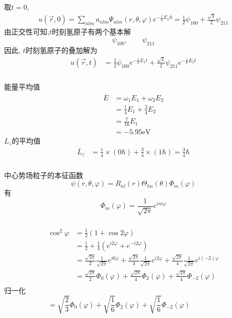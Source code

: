   \begin{frame}[label=current]
  \frametitle{}
  取$t=0$, 
  \[
  \begin{aligned}
   u(\vec{r},0)  =  \sum_{nlm} a_{nlm} \Psi _{nlm}(r,\theta,\varphi) e^{-\frac{i}{\hbar}E_n 0 } =\frac{1}{2}\psi _{100} + \frac{\sqrt{3} }{2}\psi _{211}
  \end{aligned} 
  \]
  由正交性可知,$t$时刻氢原子有两个基本解
  \[ \psi _{100}, \qquad \psi _{211}\]
  因此, $t$时刻氢原子的叠加解为
  \[
  \begin{aligned}
   u(\vec{r},t) &= \frac{1}{2}\psi _{100}e^{-\frac{i}{\hbar}E_1 t} + \frac{\sqrt{3} }{2}\psi _{211} e^{-\frac{i}{\hbar}E_2 t}
  \end{aligned} 
  \]
  \end{frame} 
  
  \begin{frame}[label=current]
  \frametitle{}
  能量平均值
  \[
  \begin{aligned}
   \overline{E} &= \omega _1 E_1 + \omega _2 E_2 \\ &=\frac{1}{4}E_1 + \frac{3}{4}E_2 \\ & = \frac{7}{16}E_1 \\ &= -5.95 \text{eV}
  \end{aligned} 
  \]
  $L_z$的平均值
  \[
  \begin{aligned}
   \overline{L}_z &= \frac{1}{4}\times(0\hbar) + \frac{3}{4}\times(1\hbar) = \frac{3}{4}\hbar 
  \end{aligned} 
  \]
  \end{frame} 

\begin{frame}[label=current]
  \frametitle{}
\解 中心势场粒子的本征函数
$$
\psi(r, \theta, \varphi)=R_{n l}(r) \Theta_{l m}(\theta) \Phi_m(\varphi)
$$
有
\[\Phi_m(\varphi) = \frac{1}{\sqrt{2\pi} }e^{im\varphi}\]

\end{frame}

\begin{frame}[label=current]
  \frametitle{}
$$
\begin{aligned}
  \cos ^2 \varphi&=\frac{1}{2}(1+\cos 2 \varphi) \\ 
  &=\frac{1}{2}+\frac{1}{4}\left(e^{ i 2\varphi}+e^{- i 2\varphi}\right)\\
  &= \frac{\sqrt{2 \pi}}{2} \frac{1}{\sqrt{2 \pi}}e^{i0\varphi} + \frac{\sqrt{2 \pi}}{4} \frac{1}{\sqrt{2 \pi}}e^{i2\varphi} + \frac{\sqrt{2 \pi}}{4} \frac{1}{\sqrt{2 \pi}}e^{i(-2)\varphi} \\
&=\frac{\sqrt{2 \pi}}{2} \Phi_0(\varphi)+\frac{\sqrt{2 \pi}}{4} \Phi_2(\varphi)+\frac{\sqrt{2 \pi}}{4} \Phi_{-2}(\varphi) \\
\end{aligned}
$$
归一化 
\[= \sqrt{\frac{2}{3}} \Phi_0(\varphi)+\sqrt{\frac{1}{6}} \Phi_2(\varphi)+\sqrt{\frac{1}{6}} \Phi_{-2}(\varphi) \qquad \qquad \]
\end{frame} 


